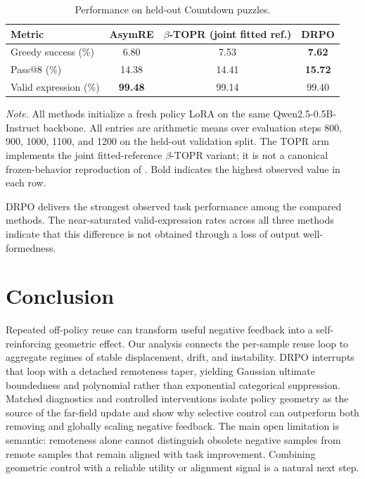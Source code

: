 \documentclass[sigconf,anonymous,review]{acmart}
\theoremstyle{acmdefinition}
\begin{document}
\begin{table}[t]
\centering
\caption{Performance on held-out Countdown puzzles.}
\label{tab:countdown_performance}

\small
\renewcommand{\arraystretch}{1.10}
\setlength{\tabcolsep}{5.0pt}

\begin{tabular*}{\columnwidth}{@{\extracolsep{\fill}}lccc}
\toprule
Metric
&
AsymRE
&
\makecell{\(\beta\)-TOPR\\(joint fitted ref.)}
&
\textbf{DRPO}
\\
\midrule

Greedy success (\%)
& 6.80
& 7.53
& \textbf{7.62}
\\

Pass@8 (\%)
& 14.38
& 14.41
& \textbf{15.72}
\\

Valid expression (\%)
& \textbf{99.48}
& 99.14
& 99.40
\\

\bottomrule
\end{tabular*}

\vspace{2pt}

\begin{minipage}{\columnwidth}
\small
\textit{Note.}
All methods initialize a fresh policy LoRA on the same
Qwen2.5-0.5B-Instruct backbone. All entries are arithmetic means over
evaluation steps 800, 900, 1000, 1100, and 1200 on the held-out
validation split. The TOPR arm implements the joint fitted-reference
\(\beta\)-TOPR variant; it is not a canonical frozen-behavior
reproduction of \citet{leroux2025tapered}. Bold indicates the highest
observed value in each row.
\end{minipage}

\end{table}

DRPO delivers the strongest observed task performance among the
compared methods. The near-saturated valid-expression rates across all
three methods indicate that this difference is not obtained through a
loss of output well-formedness.

\section{Conclusion}

Repeated off-policy reuse can transform useful negative feedback into a
self-reinforcing geometric effect. Our analysis connects the per-sample reuse
loop to aggregate regimes of stable displacement, drift, and instability.
DRPO interrupts that loop with a detached remoteness taper, yielding Gaussian
ultimate boundedness and polynomial rather than exponential categorical
suppression. Matched diagnostics and controlled interventions isolate policy
geometry as the source of the far-field update and show why selective control
can outperform both removing and globally scaling negative feedback. The main
open limitation is semantic: remoteness alone cannot distinguish obsolete
negative samples from remote samples that remain aligned with task improvement.
Combining geometric control with a reliable utility or alignment signal is a
natural next step.
\end{document}
